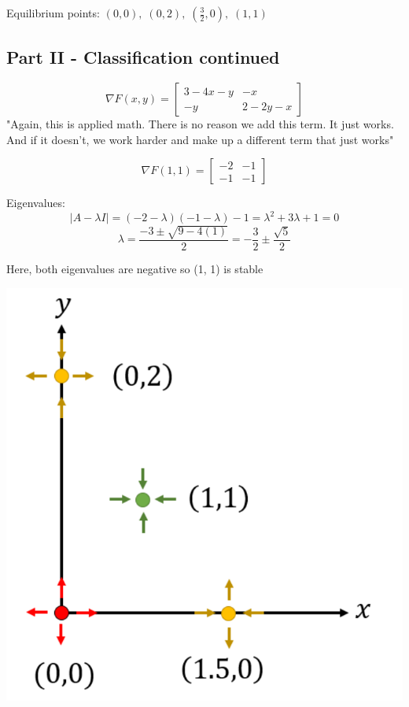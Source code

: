 \documentclass[12pt]{article}
\begin{document}
Equilibrium points: $(0, 0), \; (0, 2), \; (\frac{3}{2}, 0),\; (1, 1)$

\subsection*{Part II - Classification continued}
\[\nabla F(x, y) = \begin{bmatrix}
    3 - 4x - y & -x\\
    -y & 2 - 2y - x
\end{bmatrix}\]
"Again, this is applied math. There is no reason we add this term. It just works. And if it doesn't, we work harder and make up a different term that just works"

\[\nabla F(1, 1) = \begin{bmatrix}
    -2 & -1\\
    -1 & -1
\end{bmatrix}\] 

Eigenvalues:
\[| A - \lambda I | = (-2 - \lambda)(-1 - \lambda) - 1 = \lambda^2 + 3 \lambda + 1 = 0\]
\[\lambda = \frac{-3 \pm \sqrt{9 - 4(1)}}{2} = -\frac{3}{2} \pm \frac{\sqrt{5}}{2}\]

Here, both eigenvalues are negative so (1, 1) is stable

\includegraphics{Images/rabbits and bunnies plot.png}
\end{document}
